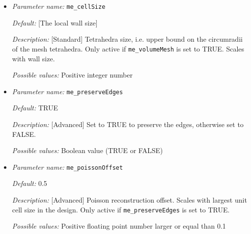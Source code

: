 \begin{itemize}
	
	{\it Default:} 3.0
	
	{\it Description:} [Standard] Tetrahedron shape quality measure, i.e. upper bound for the ratio between the circumradius of a mesh tetrahedron and its shortest edge. Only active if {\tt  me\_volumeMesh} is set to TRUE.
	
	{\it Possible values:} Positive floating point number larger than 2
	
	\item {\it Parameter name:} {\tt me\_cellSize}
	\label{parameters:me_cellSize}
	
	
	{\it Default:} [The local wall size]
	
	{\it Description:} [Standard] Tetrahedra size, i.e. upper bound on the circumradii of the mesh tetrahedra. Only active if {\tt  me\_volumeMesh} is set to TRUE. Scales with wall size.
		
	{\it Possible values:} Positive integer number 
	
	\item {\it Parameter name:} {\tt me\_preserveEdges}
	\label{parameters:me_preserveEdges}
	
	
	{\it Default:} TRUE
	
	{\it Description:} [Advanced] Set to TRUE to preserve the edges, otherwise set to FALSE.
	
	{\it Possible values:} Boolean value (TRUE or FALSE)
	
	\item {\it Parameter name:} {\tt me\_poissonOffset}
	\label{parameters:me_poissonOffset}
	
	
	{\it Default:} 0.5
	
	{\it Description:} [Advanced] Poisson reconstruction offset. Scales with largest unit cell size in the design. Only active if {\tt me\_preserveEdges} is set to TRUE.
	
	{\it Possible values:} Positive floating point number larger or equal than 0.1
\end{itemize}

